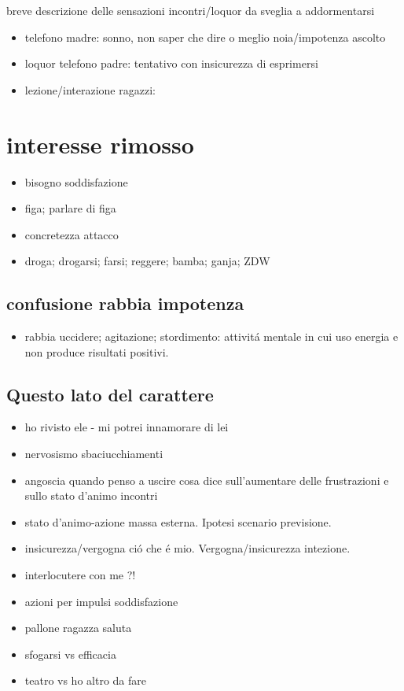breve descrizione delle sensazioni incontri/loquor da sveglia a addormentarsi
\begin{itemize}
\item telefono madre: sonno, non saper che dire o meglio noia/impotenza ascolto
\item loquor telefono padre: tentativo con insicurezza di esprimersi
\item lezione/interazione ragazzi: 
\end{itemize}

\section{interesse rimosso}

\begin{itemize}
\item bisogno soddisfazione
\item figa; parlare di figa
\item concretezza attacco
\item droga; drogarsi; farsi; reggere; bamba; ganja; ZDW
\end{itemize}

\subsection{confusione rabbia impotenza}

\begin{itemize}
\item rabbia uccidere; agitazione; stordimento: attivit\'a mentale in cui uso energia e 
non produce risultati positivi.
\end{itemize}

\subsection{Questo lato del carattere}

\begin{itemize}
\item ho rivisto ele - mi potrei innamorare di lei
\item nervosismo sbaciucchiamenti
\item angoscia quando penso a uscire cosa dice sull'aumentare delle frustrazioni e sullo stato d'animo incontri
\item stato d'animo-azione massa esterna. Ipotesi scenario previsione.
\item insicurezza/vergogna ci\'o che \'e mio. Vergogna/insicurezza intezione. 
\item interlocutere con me ?!
\item azioni per impulsi soddisfazione
\item pallone ragazza saluta
\item sfogarsi vs efficacia 
\item teatro vs ho altro da fare
\end{itemize}

